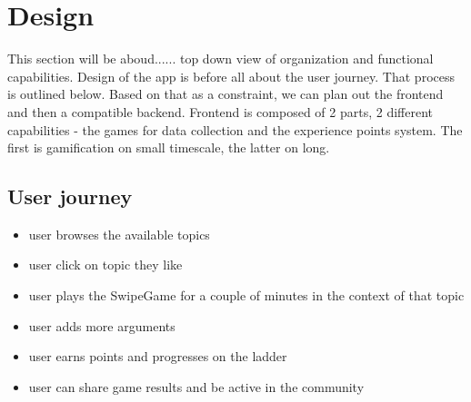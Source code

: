 \documentclass{report}
\begin{document}
{\begin{table}[h!]
 \end{table}\label{tab:collection}


\chapter{Design}
This section will be aboud...... top down view of organization and functional capabilities.
Design of the app is before all about the user journey. That process is outlined below. Based on that as a constraint, we can plan out the frontend and then a compatible backend.
Frontend is composed of 2 parts, 2 different capabilities - the games for data collection and the experience points system. The first is gamification on small timescale, the latter on long.

\section{User journey}
\begin{itemize}
  \item user browses the available topics
  \item user click on topic they like
  \item user plays the SwipeGame for a couple of minutes in the context of that topic
  \item user adds more arguments
  \item user earns points and progresses on the ladder
  \item user can share game results and be active in the community
\end{itemize}

}
\end{document}
